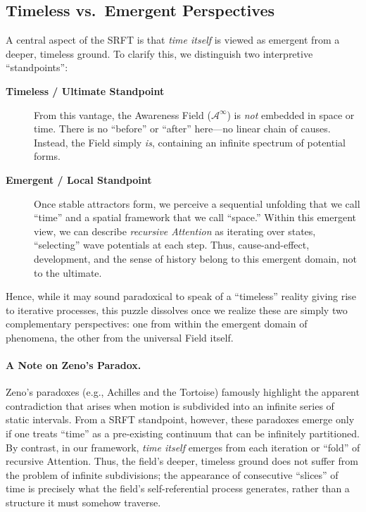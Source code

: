 \documentclass[12pt,a4paper]{article}
\begin{document}
\subsection{Timeless vs.\ Emergent Perspectives}

\noindent
A central aspect of the SRFT is that \emph{time itself} is viewed as emergent from a deeper, timeless ground. 
To clarify this, we distinguish two interpretive ``standpoints'':

\begin{description}
  \item[\textbf{Timeless / Ultimate Standpoint}] 
  From this vantage, the Awareness Field (\(\mathscr{A}^\infty\)) is \emph{not} embedded in space or time. 
  There is no ``before'' or ``after'' here---no linear chain of causes. 
  Instead, the Field simply \emph{is}, containing an infinite spectrum of potential forms.

  \item[\textbf{Emergent / Local Standpoint}] 
  Once stable attractors form, we perceive a sequential unfolding that we call ``time'' and a spatial framework that we call ``space.'' 
  Within this emergent view, we can describe \emph{recursive Attention} as iterating over states, ``selecting'' wave potentials at each step. 
  Thus, cause-and-effect, development, and the sense of history belong to this emergent domain, not to the ultimate.

\end{description}

\noindent
Hence, while it may sound paradoxical to speak of a ``timeless'' reality giving rise to iterative processes, this puzzle dissolves once we realize these are simply two complementary perspectives: one from within the emergent domain of phenomena, the other from the universal Field itself.

\paragraph{A Note on Zeno’s Paradox.}
Zeno’s paradoxes (e.g., Achilles and the Tortoise) famously highlight the apparent contradiction 
that arises when motion is subdivided into an infinite series of static intervals. 
From a SRFT standpoint, however, these paradoxes emerge only if one treats “time” 
as a pre-existing continuum that can be infinitely partitioned. By contrast, 
in our framework, \emph{time itself} emerges from each iteration or “fold” of recursive Attention. 
Thus, the field’s deeper, timeless ground does not suffer from the problem of infinite subdivisions; 
the appearance of consecutive “slices” of time is precisely what the field’s self-referential process 
generates, rather than a structure it must somehow traverse.
\end{document}
